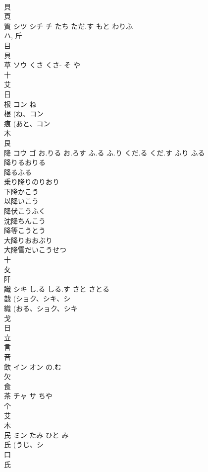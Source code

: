 \documentclass[8pt]{extreport}
\begin{document}
\begin{CJK}{UTF8}{min}
\\	貝 
\\	頁 
\\	質	シツ シチ チ	たち ただ.す もと わりふ	
\\	ハ, 斤 
\\	目 
\\	貝 
\\	草	ソウ	くさ くさ- そ や	
\\	十 
\\	艾 
\\	日 
\\	根	コン	ね	
\\	根 (ね、コン 
\\	痕 (あと、コン 
\\	木 
\\	艮 
\\	降	コウ ゴ	お.りる お.ろす ふ.る ふ.り くだ.る くだ.す ふり ふる	
\\	降りるおりる
\\	降るふる
\\	乗り降りのりおり
\\	下降かこう
\\	以降いこう
\\	降伏こうふく
\\	沈降ちんこう
\\	降等こうとう
\\	大降りおおぶり
\\	大降雪だいこうせつ
\\	十 
\\	夂 
\\	阡	
\\	識	シキ	し.る しる.す さと さとる	
\\	戠 (ショク、シキ、シ 
\\	織 (おる、ショク、シキ 
\\	戈 
\\	日 
\\	立 
\\	言 
\\	音 
\\	飲	イン オン	の.む	
\\	欠 
\\	食 
\\	茶	チャ サ	ちや	
\\	个 
\\	艾 
\\	木 
\\	民	ミン	たみ ひと み	
\\	氏 (うじ、シ 
\\	口 
\\	氏 

\end{CJK}
\end{document}

